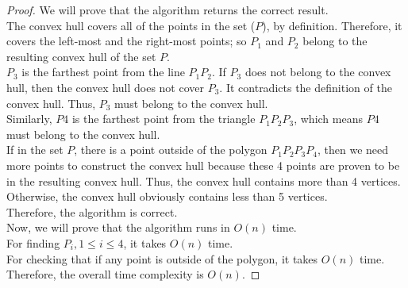 \begin{proof}
We will prove that the algorithm returns the correct result. \\

The convex hull covers all of the points in the set ($P$), by definition. Therefore, it covers the left-most and the right-most points; so $P_1$ and $P_2$ belong to the resulting convex hull of the set $P$. \\

$P_3$ is the farthest point from the line $P_1 P_2$. If $P_3$ does not belong to the convex hull, then the convex hull does not cover $P_3$. It contradicts the definition of the convex hull. Thus, $P_3$ must belong to the convex hull. \\

Similarly, $P4$ is the farthest point from the triangle $P_1 P_2 P_3$, which means $P4$ must belong to the convex hull. \\

If in the set $P$, there is a point outside of the polygon $P_1 P_2 P_3 P_4$, then we need more points to construct the convex hull because these 4 points are proven to be in the resulting convex hull. Thus, the convex hull contains more than 4 vertices. Otherwise, the convex hull obviously contains less than 5 vertices. \\

Therefore, the algorithm is correct. \\

Now, we will prove that the algorithm runs in $O(n)$ time. \\

For finding $P_i, 1 \leq i \leq 4$, it takes $O(n)$ time. \\

For checking that if any point is outside of the polygon, it takes $O(n)$ time. \\

Therefore, the overall time complexity is $O(n)$.
\end{proof}

